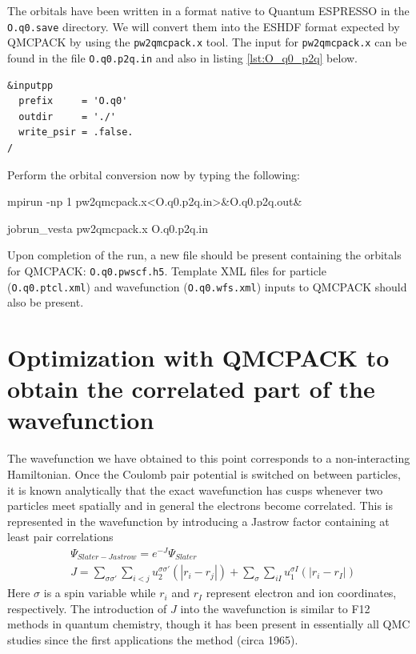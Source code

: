 The orbitals have been written in a format native to Quantum ESPRESSO in the \texttt{O.q0.save} directory.  We will convert them into the ESHDF format expected by QMCPACK by using the \texttt{pw2qmcpack.x} tool.  The input for \texttt{pw2qmcpack.x} can be found in the file \texttt{O.q0.p2q.in} and also in listing \ref{lst:O_q0_p2q} below. 

\begin{lstlisting}[caption={\texttt{pw2qmcpack.x} input file for orbital conversion (\texttt{O.q0.p2q.in})\label{lst:O_q0_p2q}}]
&inputpp
  prefix     = 'O.q0'
  outdir     = './'
  write_psir = .false.
/
\end{lstlisting}

Perform the orbital conversion now by typing the following:
\ifws
\begin{shade}
mpirun -np 1 pw2qmcpack.x<O.q0.p2q.in>&O.q0.p2q.out&
\end{shade}
\else
\begin{shade}
jobrun_vesta pw2qmcpack.x O.q0.p2q.in
\end{shade}
\fi
\noindent
Upon completion of the run, a new file should be present containing the orbitals for QMCPACK: \texttt{O.q0.pwscf.h5}.  Template XML files for particle (\texttt{O.q0.ptcl.xml}) and wavefunction (\texttt{O.q0.wfs.xml}) inputs to QMCPACK should also be present.  


\section{Optimization with QMCPACK to obtain the correlated part of the wavefunction}\label{sec:optimization_walkthrough}
The wavefunction we have obtained to this point corresponds to a non-interacting Hamiltonian.  Once the Coulomb pair potential is switched on between particles, it is known analytically that the exact wavefunction has cusps whenever two particles meet spatially and in general the electrons become correlated.  This is represented in the wavefunction by introducing a Jastrow factor containing at least pair correlations
\begin{align}
  &\Psi_{Slater-Jastrow}=e^{-J}\Psi_{Slater} \\
  &J = \sum_{\sigma\sigma'}\sum_{i<j}u^{\sigma\sigma'}_2(|r_i-r_j|) + \sum_\sigma\sum_{iI}u^{\sigma I}_1(|r_i-r_I|)
\end{align}
Here $\sigma$ is a spin variable while $r_i$ and $r_I$ represent electron and ion coordinates, respectively.  The introduction of $J$ into the wavefunction is similar to F12 methods in quantum chemistry, though it has been present in essentially all QMC studies since the first applications the method (circa 1965).

